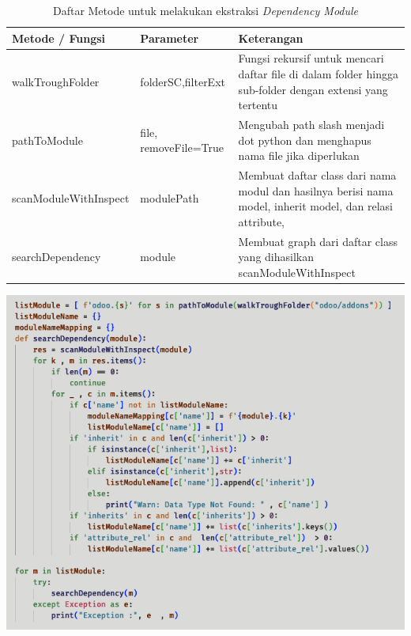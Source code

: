 \begingroup
\setlength{\LTleft}{-20cm plus -1fill}
\setlength{\LTright}{\LTleft} %
\begin{small}
	\begin{longtable}{|p{4cm}|p{3cm}|p{6cm}|}
		\caption{Daftar Metode untuk melakukan ekstraksi \textit{Dependency Module} }\\
		\hline
		\textbf{Metode / Fungsi} & \textbf{Parameter} & \textbf{Keterangan}\\
		\endfirsthead
		
		\hline  

		walkTroughFolder
		& folderSC,filterExt
		 & Fungsi rekursif untuk mencari daftar file di dalam folder hingga sub-folder dengan extensi yang tertentu  \\

		 \hline  
		
		 pathToModule
		& file, removeFile=True
		 &  Mengubah path slash menjadi dot python dan menghapus nama file jika diperlukan \\
		
		 \hline

		scanModuleWithInspect
		& modulePath
		 &  Membuat daftar class dari nama modul dan hasilnya berisi nama model, inherit model, dan relasi attribute,  \\
		\hline  

		searchDependency
		& module
		 & Membuat graph dari daftar class yang dihasilkan scanModuleWithInspect \\
		\hline  

	\end{longtable}
\end{small}
\endgroup

\begin{center}
	\includegraphics[width=14cm]{img/bab_4/def_inspect_1.png}
	\label{fig:def_inspect_1}
\end{center}

